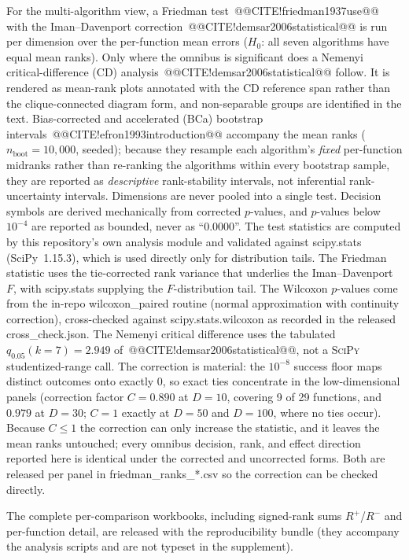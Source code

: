 \documentclass[10pt,a4paper]{article}
\begin{document}
For the multi-algorithm view, a Friedman
test~@@CITE!friedman1937use@@ with the Iman--Davenport correction~@@CITE!demsar2006statistical@@ is
run per dimension over the per-function mean errors ($H_{0}$: all
seven algorithms have equal mean ranks). Only where the
omnibus is significant does a Nemenyi critical-difference (CD)
analysis~@@CITE!demsar2006statistical@@ follow. It is rendered as mean-rank plots
annotated with the CD reference span rather than the clique-connected
diagram form, and non-separable groups are identified in the text. Bias-corrected
and accelerated (BCa) bootstrap intervals~@@CITE!efron1993introduction@@
accompany the mean ranks ($n_{\mathrm{boot}} = 10{,}000$, seeded); because
they resample each algorithm's \emph{fixed} per-function midranks rather than
re-ranking the algorithms within every bootstrap sample, they are reported as
\emph{descriptive} rank-stability intervals, not inferential rank-uncertainty
intervals.
Dimensions are never pooled into a single test. Decision symbols are
derived mechanically from corrected $p$-values, and $p$-values below
$10^{-4}$ are reported as bounded, never as ``0.0000''. The test statistics are computed by this repository's own analysis module and
validated against scipy.stats (SciPy~1.15.3), which is used directly
only for distribution tails. The Friedman statistic uses the tie-corrected
rank variance that underlies the Iman--Davenport $F$, with scipy.stats
supplying the $F$-distribution tail. The Wilcoxon $p$-values come from the
in-repo wilcoxon\_paired routine (normal approximation with continuity
correction), cross-checked against scipy.stats.wilcoxon as recorded
in the released cross\_check.json. The Nemenyi critical difference uses the tabulated
$q_{0.05}(k = 7) = 2.949$ of~@@CITE!demsar2006statistical@@, not a \textsc{SciPy}
studentized-range call. The correction
is material: the $10^{-8}$ success floor maps distinct outcomes onto
exactly $0$, so exact ties concentrate in the low-dimensional panels
(correction factor $C = 0.890$ at $D = 10$, covering 9 of 29 functions,
and $0.979$ at $D = 30$; $C = 1$ exactly at $D = 50$ and $D = 100$, where
no ties occur). Because $C \le 1$ the correction can only increase the
statistic, and it leaves the mean ranks untouched; every omnibus decision,
rank, and effect direction reported here is identical under the corrected
and uncorrected forms. Both are released per panel in
friedman\_ranks\_*.csv so the correction can be checked directly.

The complete
per-comparison workbooks, including signed-rank sums $R^{+}$/$R^{-}$
and per-function detail, are released with the reproducibility bundle
(they accompany the analysis scripts and are not typeset in the supplement).
\end{document}
